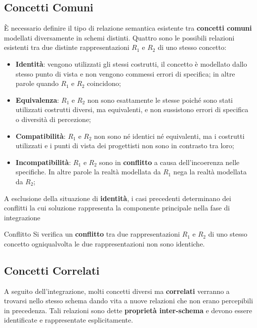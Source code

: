 \subsection{Concetti Comuni}\label{sub:db_concetti_comuni} %
È necessario definire il tipo di relazione semantica esistente tra \textbf{concetti comuni} modellati diversamente in schemi distinti.
Quattro sono le possibili relazioni esistenti tra due distinte rappresentazioni $R_1$ e $R_2$ di uno stesso concetto:
\begin{itemize}
    \item \textbf{Identità}: vengono utilizzati gli stessi costrutti, il concetto è modellato dallo stesso punto di vista e non vengono commessi errori di specifica; in altre parole quando $R_1$ e $R_2$ coincidono;
    \item \textbf{Equivalenza}: $R_1$ e $R_2$ non sono esattamente le stesse poiché sono stati utilizzati costrutti diversi, ma equivalenti, e non sussistono errori di specifica o diversità di percezione;
    \item \textbf{Compatibilità}: $R_1$ e $R_2$ non sono né identici né equivalenti, ma i costrutti utilizzati e i punti di vista dei progettisti non sono in contrasto tra loro;
    \item \textbf{Incompatibilità}: $R_1$ e $R_2$ sono in \textbf{conflitto} a causa dell'incoerenza nelle specifiche.
        In altre parole la realtà modellata da $R_1$ nega la realtà modellata da $R_2$;
\end{itemize}
\begin{warning}
    A esclusione della situazione di \textbf{identità}, i casi precedenti determinano dei conflitti la cui soluzione rappresenta la componente principale nella fase di integrazione
\end{warning}
\begin{definition}{Conflitto}{}
    Si verifica un \textbf{conflitto} tra due rappresentazioni $R_1$ e $R_2$ di uno stesso concetto ogniqualvolta le due rappresentazioni non sono identiche.
\end{definition}
%
\subsection{Concetti Correlati}\label{sub:db_concetti_correlati} %
A seguito dell'integrazione, molti concetti diversi ma \textbf{correlati} verranno a trovarsi nello stesso schema dando vita a nuove relazioni che non erano percepibili in precedenza.
Tali relazioni sono dette \textbf{proprietà inter-schema} e devono essere identificate e rappresentate esplicitamente.
%
